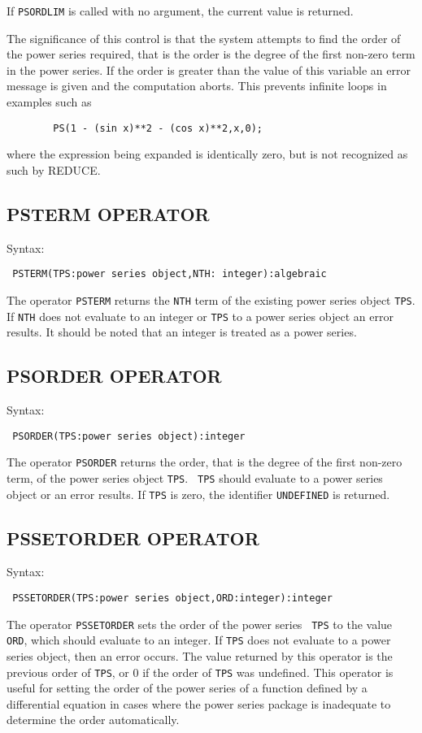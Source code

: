 If {\tt PSORDLIM} is called with no argument, the current value is
returned.

The significance of this control is that the system attempts to find
the order of the power series required, that is the order is the
degree of the first non-zero term in the power series.  If the order
is greater than the value of this variable an error message is given
and the computation aborts. This prevents infinite loops in examples
such as
\begin{verbatim}
        PS(1 - (sin x)**2 - (cos x)**2,x,0);
\end{verbatim}
where the expression being expanded is identically zero, but is not
recognized as such by REDUCE.


\subsection*{PSTERM OPERATOR}

Syntax:
\begin{verbatim}
 PSTERM(TPS:power series object,NTH: integer):algebraic
\end{verbatim}
The operator {\tt PSTERM} returns the {\tt NTH} term of the existing
power series object {\tt TPS}. If {\tt NTH} does not evaluate to
an integer or {\tt TPS} to a power series object an error results.  It
should be noted that an integer is treated as a power series.


\subsection*{PSORDER OPERATOR}

Syntax:
\begin{verbatim}
 PSORDER(TPS:power series object):integer
\end{verbatim}
The operator {\tt PSORDER} returns the order, that is the degree of
the first non-zero term, of the power series object {\tt TPS}. {\tt
TPS} should evaluate to a power series object or an error results. If
{\tt TPS} is zero, the identifier {\tt UNDEFINED} is returned.

\subsection*{PSSETORDER OPERATOR}

Syntax:
\begin{verbatim}
 PSSETORDER(TPS:power series object,ORD:integer):integer
\end{verbatim}
The operator {\tt PSSETORDER} sets the order of the power series {\tt
TPS} to the value {\tt ORD}, which should evaluate to an integer. If
{\tt TPS} does not evaluate to a power series object, then an error
occurs. The value returned by this operator is the previous order of
{\tt TPS}, or 0 if the order of {\tt TPS} was undefined.  This
operator is useful for setting the order of the power series of a
function defined by a differential equation in cases where the power
series package is inadequate to determine the order automatically.


